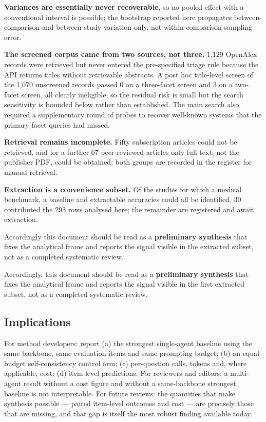 \documentclass[11pt,a4paper]{article}
\begin{document}
\textbf{Variances are essentially never recoverable}, so no pooled effect with a conventional
interval is possible; the bootstrap reported here propagates between-comparison and
between-study variation only, not within-comparison sampling error.

\textbf{The screened corpus came from two sources, not three.} 1{,}129 OpenAlex records were
retrieved but never entered the pre-specified triage rule because the API returns titles
without retrievable abstracts. A post hoc title-level screen of the 1{,}070 unscreened records
passed 0 on a three-facet screen and 3 on a two-facet screen, all clearly ineligible, so the
residual risk is small but the search sensitivity is bounded below rather than established.
The main search also required a supplementary round of probes to recover well-known systems
that the primary facet queries had missed.

\textbf{Retrieval remains incomplete.} Fifty subscription articles could not be retrieved,
and for a further 67 peer-reviewed articles only full text, not the publisher PDF, could be
obtained; both groups are recorded in the register for manual retrieval.

\textbf{Extraction is a convenience subset.} Of the studies for which a medical benchmark, a
baseline and extractable accuracies could all be identified, 30 contributed the 293 rows
analysed here; the remainder are registered and await extraction.

Accordingly this document should be read as a \textbf{preliminary synthesis} that fixes the
analytical frame and reports the signal visible in the extracted subset, not as a completed
systematic review.

Accordingly, this document should be read as a \textbf{preliminary synthesis} that fixes the
analytical frame and reports the signal visible in the first extracted subset, not as a
completed systematic review.

\subsection{Implications}
For method developers: report (a) the strongest single-agent baseline using the same
backbone, same evaluation items and same prompting budget; (b) an equal-budget
self-consistency control arm; (c) per-question calls, tokens and, where applicable, cost;
(d) item-level predictions. For reviewers and editors: a multi-agent result without a cost
figure and without a same-backbone strongest baseline is not interpretable.
For future reviews: the quantities that make synthesis possible --- paired item-level
outcomes and cost --- are precisely those that are missing, and that gap is itself the
most robust finding available today.
\end{document}
